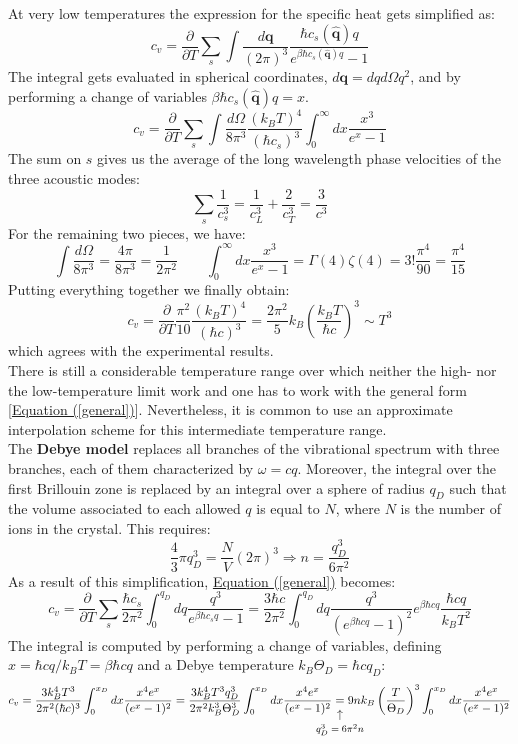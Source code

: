 \documentclass[10.75pt,a4paper,openright,bottom=2cm]{article}
\renewcommand{\Vec}[1]{\boldsymbol{#1}}
\begin{document}
At very low temperatures the expression for the specific heat gets simplified as:
\[
c_v=\frac{\partial}{\partial T}\sum_s\int\frac{d\Vec{q}}{(2\pi)^3}\frac{\hbar c_s(\hat{\Vec{q}})q}{e^{\beta\hbar c_s(\hat{\Vec{q}})q}-1}
\]
The integral gets evaluated in spherical coordinates, $d\Vec{q}=dqd\Omega q^2$, and by performing a change of variables $\beta\hbar c_s(\hat{\Vec{q}})q=x$.
\[
c_v=\frac{\partial}{\partial T}\sum_s\int\frac{d\Omega}{8\pi^3}\frac{(k_BT)^4}{(\hbar c_s)^3}\int_0^\infty dx\frac{x^3}{e^x-1}
\]
The sum on $s$ gives us the average of the long wavelength phase velocities of the three acoustic modes:
\[
\sum_s\frac{1}{c_s^3}=\frac{1}{c_L^3}+\frac{2}{c_T^3}=\frac{3}{c^3}
\]
For the remaining two pieces, we have:
\[
\int\frac{d\Omega}{8\pi^3}=\frac{4\pi}{8\pi^3}=\frac{1}{2\pi^2} \qquad \int_0^\infty dx\frac{x^3}{e^x-1}=\Gamma(4)\zeta(4)=3!\frac{\pi^4}{90}=\frac{\pi^4}{15}
\]
Putting everything together we finally obtain:
\[
c_v=\frac{\partial}{\partial T}\frac{\pi^2}{10}\frac{(k_BT)^4}{(\hbar c)^3}=\frac{2\pi^2}{5}k_B\left(\frac{k_BT}{\hbar c}\right)^3\sim T^3
\]
which agrees with the experimental results.\\
There is still a considerable temperature range over which neither the high- nor the low-temperature limit work and one has to work with the general form [\hyperref[general]{Equation (\ref{general})}]. Nevertheless, it is common to use an approximate interpolation scheme for this intermediate temperature range.\\
The \textbf{Debye model} replaces all branches of the vibrational spectrum with three branches, each of them characterized by $\omega=cq$. Moreover, the integral over the first Brillouin zone is replaced by an integral over a sphere of radius $q_D$ such that the volume associated to each allowed $q$ is equal to $N$, where $N$ is the number of ions in the crystal. This requires:
\[
\frac{4}{3}\pi q_D^3=\frac{N}{V}(2\pi)^3\Rightarrow n=\frac{q_D^3}{6\pi^2}
\]
As a result of this simplification, \hyperref[general]{Equation (\ref{general})} becomes:
\[
c_v=\frac{\partial}{\partial T}\sum_s\frac{\hbar c_s}{2\pi^2}\int_0^{q_D}dq\frac{q^3}{e^{\beta\hbar c_sq}-1}=\frac{3\hbar c}{2\pi^2}\int_0^{q_D}dq\frac{q^3}{(e^{\beta\hbar cq}-1)^2}e^{\beta\hbar cq}\frac{\hbar cq}{k_BT^2}
\]
The integral is computed by performing a change of variables, defining $x=\hbar cq/k_BT=\beta\hbar cq$ and a Debye temperature $k_B\Theta_D=\hbar cq_D$:
\[
c_v=\frac{3k_B^4T^3}{2\pi^2(\hbar c)^3}\int_0^{x_D}dx\frac{x^4e^x}{(e^x-1)^2}=\frac{3k_B^4T^3q_D^3}{2\pi^2k_B^3\Theta_D^3}\int_0^{x_D}dx\frac{x^4e^x}{(e^x-1)^2}\underset{\mathclap{\tikz \node {$\uparrow$} node [below=1ex] {\footnotesize $q_D^3=6\pi^2n$};}}{=}9nk_B\left(\frac{T}{\Theta_D}\right)^3\int_0^{x_D}dx\frac{x^4e^x}{(e^x-1)^2}
\]
\end{document}
